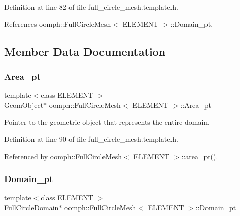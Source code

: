 Definition at line 82 of file full\+\_\+circle\+\_\+mesh.\+template.\+h.



References oomph\+::\+Full\+Circle\+Mesh$<$ E\+L\+E\+M\+E\+N\+T $>$\+::\+Domain\+\_\+pt.



\subsection{Member Data Documentation}
\mbox{\label{classoomph_1_1FullCircleMesh_a0eb9088080115746b8570264f444c37f}} 
\subsubsection{\texorpdfstring{Area\+\_\+pt}{Area\_pt}}
{\footnotesize\ttfamily template$<$class E\+L\+E\+M\+E\+NT $>$ \\
Geom\+Object$\ast$ \hyperlink{classoomph_1_1FullCircleMesh}{oomph\+::\+Full\+Circle\+Mesh}$<$ E\+L\+E\+M\+E\+NT $>$\+::Area\+\_\+pt\hspace{0.3cm}{\ttfamily [protected]}}



Pointer to the geometric object that represents the entire domain. 



Definition at line 90 of file full\+\_\+circle\+\_\+mesh.\+template.\+h.



Referenced by oomph\+::\+Full\+Circle\+Mesh$<$ E\+L\+E\+M\+E\+N\+T $>$\+::area\+\_\+pt().

\mbox{\label{classoomph_1_1FullCircleMesh_a042c0729727a71bee0660f44c33f8691}} 
\subsubsection{\texorpdfstring{Domain\+\_\+pt}{Domain\_pt}}
{\footnotesize\ttfamily template$<$class E\+L\+E\+M\+E\+NT $>$ \\
\hyperlink{classoomph_1_1FullCircleDomain}{Full\+Circle\+Domain}$\ast$ \hyperlink{classoomph_1_1FullCircleMesh}{oomph\+::\+Full\+Circle\+Mesh}$<$ E\+L\+E\+M\+E\+NT $>$\+::Domain\+\_\+pt\hspace{0.3cm}{\ttfamily [protected]}}



